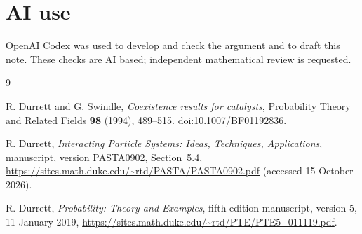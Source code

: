 \documentclass[11pt,a4paper]{article}
\begin{document}
\section*{AI use}
OpenAI Codex was used to develop and check the argument and to draft this
note. These checks are AI based; independent mathematical review is
requested.

\begin{thebibliography}{9}

R. Durrett and G. Swindle,
\emph{Coexistence results for catalysts},
Probability Theory and Related Fields \textbf{98} (1994), 489--515.
\href{https://doi.org/10.1007/BF01192836}{doi:10.1007/BF01192836}.

R. Durrett,
\emph{Interacting Particle Systems: Ideas, Techniques, Applications},
manuscript, version PASTA0902, Section~5.4,
\url{https://sites.math.duke.edu/~rtd/PASTA/PASTA0902.pdf}
(accessed 15 October 2026).

R. Durrett,
\emph{Probability: Theory and Examples},
fifth-edition manuscript, version 5, 11 January 2019,
\url{https://sites.math.duke.edu/~rtd/PTE/PTE5_011119.pdf}.

\end{thebibliography}
\end{document}
